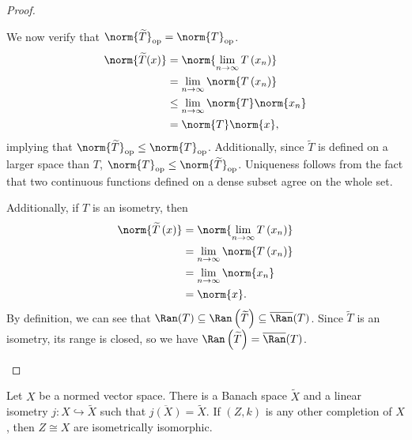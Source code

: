 \documentclass[10pt]{mypackage}
\begin{document}
\begin{proof}
\begin{enumerate}[(1)]
      We now verify that $\norm{\widetilde{T}}_{\text{op}} = \norm{T}_{\text{op}}$.
      \begin{align*}
        \norm{\widetilde{T}(x)} &= \norm{\lim_{n\rightarrow\infty}T\left(x_n\right)}\\
                                &= \lim_{n\rightarrow\infty}\norm{T\left(x_n\right)}\\
                                &\leq \lim_{n\rightarrow\infty}\norm{T}\norm{x_n}\\
                                &= \norm{T}\norm{x},
      \end{align*}
      implying that $\norm{\widetilde{T}}_{\text{op}}\leq \norm{T}_{\text{op}}$. Additionally, since $\widetilde{T}$ is defined on a larger space than $T$, $\norm{T}_{\text{op}}\leq \norm{\widetilde{T}}_{\text{op}}$. Uniqueness follows from the fact that two continuous functions defined on a dense subset agree on the whole set.\newline

      Additionally, if $T$ is an isometry, then
      \begin{align*}
        \norm{\widetilde{T}\left(x\right)} &= \norm{\lim_{n\rightarrow\infty}T\left(x_n\right)}\\
                                           &= \lim_{n\rightarrow\infty}\norm{T\left(x_n\right)}\\
                                           &= \lim_{n\rightarrow\infty}\norm{x_n}\\
                                           &= \norm{x}.
      \end{align*}
      By definition, we can see that $\Ran(T) \subseteq \Ran\left(\widetilde{T}\right) \subseteq \overline{\Ran}(T)$. Since $\widetilde{T}$ is an isometry, its range is closed, so we have $\Ran\left(\widetilde{T}\right) = \overline{\Ran}(T)$.
  \end{enumerate}
\end{proof}
\begin{theorem}
  Let $X$ be a normed vector space. There is a Banach space $\widetilde{X}$ and a linear isometry $j: X\hookrightarrow \widetilde{X}$ such that $\overline{j(X)} = \widetilde{X}$. If $\left(Z,k\right)$ is any other completion of $X$, then $Z\cong X$ are isometrically isomorphic.
\end{theorem}
\end{document}
